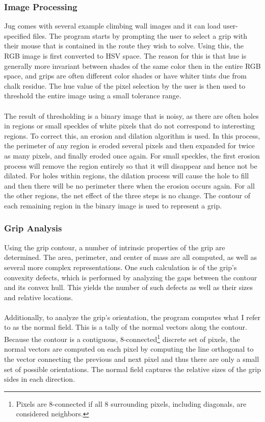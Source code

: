 \documentclass[pdftex,12pt]{article}
\theoremstyle{definition}
\theoremstyle{remark}
\begin{document}
\subsubsection*{Image Processing}
Jug comes with several example climbing wall images and it can load user-specified files. The program starts by prompting the user to select a grip with their mouse that is contained in the route they wish to solve. Using this, the RGB image is first converted to HSV space. The reason for this is that hue is generally more invariant between shades of the same color then in the entire RGB space, and grips are often different color shades or have whiter tints due from chalk residue. The hue value of the pixel selection by the user is then used to threshold the entire image using a small tolerance range.\\ \\
The result of thresholding is a binary image that is noisy, as there are often holes in regions or small speckles of white pixels that do not correspond to interesting regions. To correct this, an erosion and dilation algorithm is used. In this process, the perimeter of any region is eroded several pixels and then expanded for twice as many pixels, and finally eroded once again. For small speckles, the first erosion process will remove the region entirely so that it will disappear and hence not be dilated. For holes within regions, the dilation process will cause the hole to fill and then there will be no perimeter there when the erosion occurs again. For all the other regions, the net effect of the three steps is no change. The contour of each remaining region in the binary image is used to represent a grip.

\subsubsection*{Grip Analysis}
Using the grip contour, a number of intrinsic properties of the grip are determined. The area, perimeter, and center of mass are all computed, as well as several more complex representations. One such calculation is of the grip's convexity defects, which is performed by analyzing the gaps between the contour and its convex hull. This yields the number of such defects as well as their sizes and relative locations.\\ \\
Additionally, to analyze the grip's orientation, the program computes what I refer to as the normal field. This is a tally of the normal vectors along the contour. Because the contour is a contiguous, 8-connected\footnote{Pixels are 8-connected if all 8 surrounding pixels, including diagonals, are considered neighbors.} discrete set of pixels, the normal vectors are computed on each pixel by computing the line orthogonal to the vector connecting the previous and next pixel and thus there are only a small set of possible orientations. The normal field captures the relative sizes of the grip sides in each direction.
\end{document}
